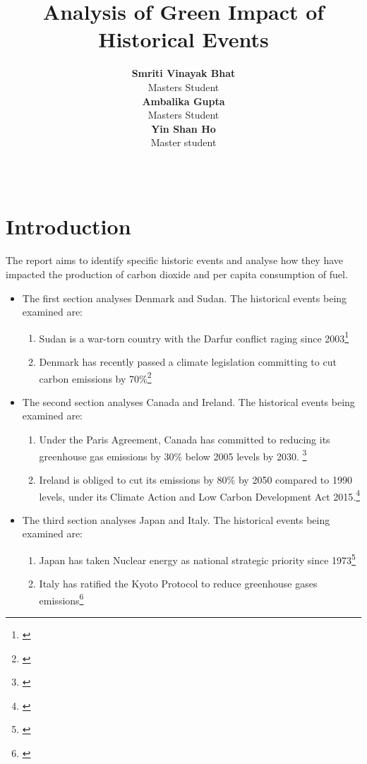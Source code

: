 \documentclass[11pt,a4paper,]{article}
\title{Analysis of Green Impact of Historical Events}
\author{\sf\Large\textbf{ Smriti Vinayak Bhat}\\ {\sf\large Masters Student\\[0.5cm]} \sf\Large\textbf{ Ambalika Gupta}\\ {\sf\large Masters Student\\[0.5cm]} \sf\Large\textbf{ Yin Shan Ho}\\ {\sf\large Master student\\[0.5cm]}}
\date{\sf\Date~\Month~\Year}
\makeatletter
\providecommand{\tightlist}{%
  \setlength{\itemsep}{0pt}\setlength{\parskip}{0pt}}
\def\titlepage{\front{\expandafter{\@title}}{\@author}{\@organization}}
\makeatother
\begin{document}
\titlepage

\section*{Introduction}

The report aims to identify specific historic events and analyse how they have impacted the production of carbon dioxide and per capita consumption of fuel.

\begin{itemize}
\tightlist
\item
  The first section analyses Denmark and Sudan. The historical events being examined are:

  \begin{enumerate}
  \def\labelenumi{\arabic{enumi}.}
  \tightlist
  \item
    Sudan is a war-torn country with the Darfur conflict raging since 2003\footnote{\textcite{sudan}}
  \item
    Denmark has recently passed a climate legislation committing to cut carbon emissions by 70\%\footnote{\textcite{denmark}}
  \end{enumerate}
\item
  The second section analyses Canada and Ireland. The historical events being examined are:

  \begin{enumerate}
  \def\labelenumi{\arabic{enumi}.}
  \tightlist
  \item
    Under the Paris Agreement, Canada has committed to reducing its greenhouse gas emissions by 30\% below 2005 levels by 2030. \footnote{\textcite{canada4}}
  \item
    Ireland is obliged to cut its emissions by 80\% by 2050 compared to 1990 levels, under its Climate Action and Low Carbon Development Act 2015.\footnote{\textcite{ireland2}}
  \end{enumerate}
\item
  The third section analyses Japan and Italy. The historical events being examined are:

  \begin{enumerate}
  \def\labelenumi{\arabic{enumi}.}
  \tightlist
  \item
    Japan has taken Nuclear energy as national strategic priority since 1973\footnote{\textcite{japan}}
  \item
    Italy has ratified the Kyoto Protocol to reduce greenhouse gases emissions\footnote{\textcite{kyoto}}
  \end{enumerate}
\end{itemize}
\end{document}

